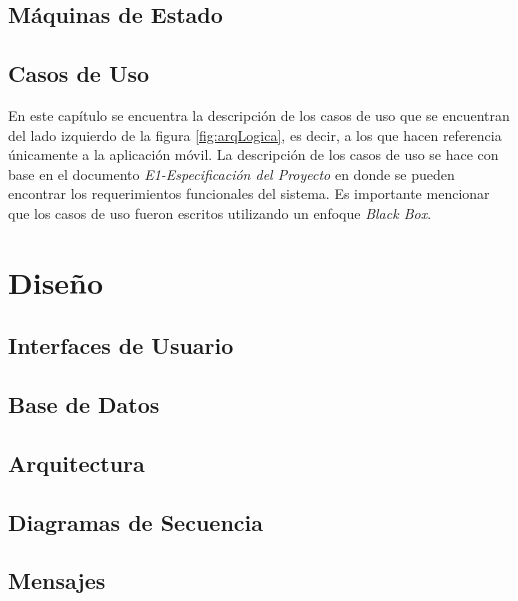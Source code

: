 \documentclass[11pt,twoside]{book}
\begin{document}
	\chapter{Máquinas de Estado}
	\label{ch:maquinas}
	
	
	\chapter{Casos de Uso}
	En este capítulo se encuentra la descripción de los casos de uso que se encuentran del lado izquierdo de la figura \ref{fig:arqLogica}, es decir, a los que hacen referencia únicamente a la aplicación móvil. La descripción de los casos de uso se hace con base en el documento \textit{E1-Especificación del Proyecto} en donde se pueden encontrar los requerimientos funcionales del sistema. Es importante mencionar que los casos de uso fueron escritos utilizando un enfoque \textit{Black Box}.
	\label{ch:casosDeUso}
	
	
	\part{Diseño}
	
	\chapter{Interfaces de Usuario}
	\label{ch:interfaces}
	

	\chapter{Base de Datos}
	\label{ch:bd}
	
	
	\chapter{Arquitectura}
	\label{ch:arquitectura}
	
	
	\chapter{Diagramas de Secuencia}
	\label{ch:diagramasDeSecuencia}
	
	
	\appendix
	
	\chapter{Mensajes}
	\label{ch:mensajes}
	
	
	\newpage
	\clossing
	
\end{document}
